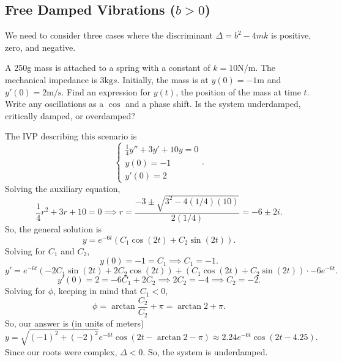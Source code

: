 \subsection{Free Damped Vibrations ($b > 0$)}
We need to consider three cases where the discriminant $\Delta = b^2 - 4mk$ is positive, zero, and negative. 





\begin{example}
	A 250g mass is attached to a spring with a constant of $k = 10\text{N/m}$. The mechanical impedance is 3$\text{kg}{s}$. Initially, the mass is at $y(0)=-1\text{m}$ and $y'(0)=2\text{m/s}$. Find an expression for $y(t)$, the position of the mass at time $t$. Write any oscillations as a $\cos$ and a phase shift. Is the system underdamped, critically damped, or overdamped?
\end{example}
\noindent
The IVP describing this scenario is
\begin{equation*}
	\begin{cases}
		\frac{1}{4}y'' + 3y' + 10y = 0 \\
		y(0) = -1 \\
		y'(0) = 2
	\end{cases}.
\end{equation*}
Solving the auxiliary equation,
\begin{equation*}
	\frac{1}{4}r^2 + 3r + 10 = 0 \implies r = \frac{-3 \pm \sqrt{3^2 - 4(1/4)(10)}}{2(1/4)} = -6 \pm 2i.
\end{equation*}
So, the general solution is
\begin{equation*}
	y = e^{-6t}\left(C_1\cos{(2t)} + C_2\sin{(2t)}\right).
\end{equation*}
Solving for $C_1$ and $C_2$,
\begin{equation*}
	y(0) = -1 = C_1 \implies C_1 = -1.
\end{equation*}
\begin{equation*}
	y' = e^{-6t}\left(-2C_1\sin{(2t)} + 2C_2\cos{(2t)}\right) + \left(C_1\cos{(2t)} + C_2\sin{(2t)}\right) \cdot -6e^{-6t}.
\end{equation*}
\begin{equation*}
	y'(0) = 2 = -6C_1 + 2C_2 \implies 2C_2 = -4 \implies C_2 = -2.
\end{equation*}
Solving for $\phi$, keeping in mind that $C_1 < 0$,
\begin{equation*}
	\phi = \arctan{\frac{C_2}{C_2}} + \pi = \arctan{2} + \pi.
\end{equation*}
So, our answer is (in units of meters)
\begin{equation*}
	y = \sqrt{(-1)^2 + (-2)^2}e^{-6t}\cos{\left(2t - \arctan{2} - \pi\right)} \approx 2.24e^{-6t}\cos{\left(2t - 4.25\right)}.
\end{equation*}
Since our roots were complex, $\Delta < 0$. So, the system is underdamped.